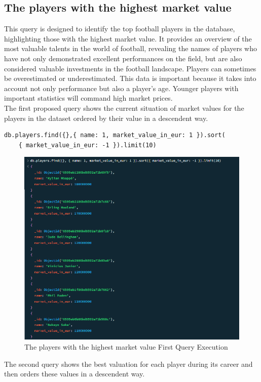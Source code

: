 \documentclass{Configuration_Files/PoliMi3i_thesis}
\begin{document}
\subsection{The players with the highest market value}
This query is designed to identify the top football players in the database, highlighting those with the highest market value. It provides an overview of the most valuable talents in the world of football, revealing the names of players who have not only demonstrated excellent performances on the field, but are also considered valuable investments in the football landscape. Players can sometimes be overestimated or underestimated. This data is important because it takes into account not only performance but also a player's age. Younger players with important statistics will command high market prices.
\\The first proposed query shows the current situation of market values for the players in the dataset ordered by their value in a descendent way.
\begin{verbatim}
db.players.find({},{ name: 1, market_value_in_eur: 1 }).sort(
    { market_value_in_eur: -1 }).limit(10)
\end{verbatim}
\begin{figure}[htbp]
    \centering
    \includegraphics[scale=0.8]{Images/Queries/Highest_value_players/1.png}
    \caption{The players with the highest market value First Query Execution}
\end{figure}
The second query shows the best valuation for each player during its career and then orders these values in a descendent way.
\end{document}
